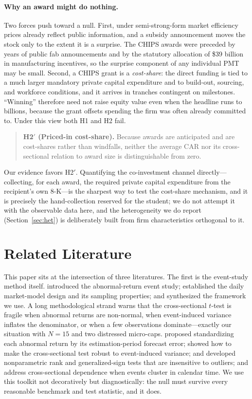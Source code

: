 \documentclass[12pt]{article}
\begin{document}
\paragraph{Why an award might do nothing.} Two forces push toward a null. First, under
semi-strong-form market efficiency \citep{fama1970,fama1969} prices already reflect public
information, and a subsidy announcement moves the stock only to the extent it is a surprise. The
CHIPS awards were preceded by years of public fab announcements and by the statutory allocation of
\$39 billion in manufacturing incentives, so the surprise component of any individual PMT may be
small. Second, a CHIPS grant is a \emph{cost-share}: the direct funding is tied to a much larger
mandatory private capital expenditure and to build-out, sourcing, and workforce conditions, and it
arrives in tranches contingent on milestones. ``Winning'' therefore need not raise equity value
even when the headline runs to billions, because the grant offsets spending the firm was often
already committed to. Under this view both H1 and H2 fail.
\begin{quote}
\textbf{H2$'$ (Priced-in cost-share).} Because awards are anticipated and are cost-shares rather
than windfalls, neither the average CAR nor its cross-sectional relation to award size is
distinguishable from zero.
\end{quote}
Our evidence favors H2$'$. Quantifying the co-investment channel directly---collecting, for each
award, the required private capital expenditure from the recipient's own 8-K---is the sharpest way
to test the cost-share mechanism, and it is precisely the hand-collection reserved for the student;
we do not attempt it with the observable data here, and the heterogeneity we do report
(Section~\ref{sec:het}) is deliberately built from firm characteristics orthogonal to it.

\section{Related Literature}\label{sec:lit}
This paper sits at the intersection of three literatures. The first is the event-study method
itself. \citet{fama1969} introduced the abnormal-return event study; \citet{brown1985} established
the daily market-model design and its sampling properties; and \citet{mackinlay1997} synthesized
the framework we use. A long methodological strand warns that the cross-sectional $t$-test is
fragile when abnormal returns are non-normal, when event-induced variance inflates the
denominator, or when a few observations dominate---exactly our situation with $N=15$ and two
distressed micro-caps. \citet{patell1976} proposed standardizing each abnormal return by its
estimation-period forecast error; \citet{boehmer1991} showed how to make the cross-sectional test
robust to event-induced variance; \citet{corrado1989} and \citet{cowan1992} developed
nonparametric rank and generalized-sign tests that are insensitive to outliers; and
\citet{kolari2010} address cross-sectional dependence when events cluster in calendar time. We use
this toolkit not decoratively but diagnostically: the null must survive every reasonable
benchmark and test statistic, and it does.
\end{document}
